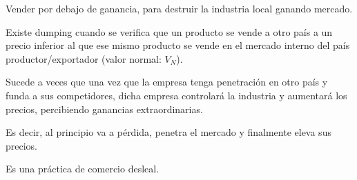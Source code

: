 Vender por debajo de ganancia,
para destruir la industria local ganando mercado.

Existe dumping cuando se verifica que un producto se vende a otro país a un precio inferior
al que ese mismo producto se vende en el mercado interno del país productor/exportador 
(valor normal: \(V_N\)).

Sucede a veces que una vez que la empresa tenga penetración en otro país y funda a sus competidores,
dicha empresa controlará la industria y aumentará los precios,
percibiendo ganancias extraordinarias.

Es decir,
al principio va a pérdida,
penetra el mercado
y finalmente eleva sus precios.

Es una práctica de comercio desleal.
